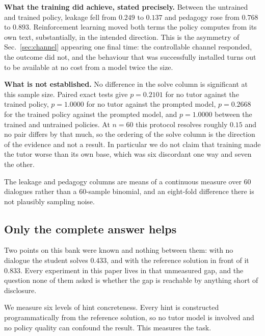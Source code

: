 \textbf{What the training did achieve, stated precisely.} Between the untrained
and trained policy, leakage fell from $0.249$ to $0.137$ and pedagogy rose from
$0.768$ to $0.893$. Reinforcement learning moved both terms the policy computes
from its own text, substantially, in the intended direction. This is the
asymmetry of Sec.~\ref{sec:channel} appearing one final time: the controllable
channel responded, the outcome did not, and the behaviour that was successfully
installed turns out to be available at no cost from a model twice the size.

\textbf{What is not established.} No difference in the solve column is
significant at this sample size. Paired exact tests give $p{=}0.2101$ for no
tutor against the trained policy, $p{=}1.0000$ for no tutor against the
prompted model, $p{=}0.2668$ for the trained policy against the prompted model,
and $p{=}1.0000$ between the trained and untrained policies. At $n{=}60$ this
protocol resolves roughly $0.15$ and no pair differs by that much, so the
ordering of the solve column is the direction of the evidence and not a result.
In particular we do not claim that training made the tutor worse than its own
base, which was six discordant one way and seven the other.

The leakage and pedagogy columns are means of a continuous measure over 60
dialogues rather than a 60-sample binomial, and an eight-fold difference there
is not plausibly sampling noise.


\subsection{Only the complete answer helps}
\label{sec:ladder}

Two points on this bank were known and nothing between them: with no dialogue
the student solves $0.433$, and with the reference solution in front of it
$0.833$. Every experiment in this paper lives in that unmeasured gap, and the
question none of them asked is whether the gap is reachable by anything short
of disclosure.

We measure six levels of hint concreteness. Every hint is constructed
programmatically from the reference solution, so no tutor model is involved and
no policy quality can confound the result. This measures the task.

